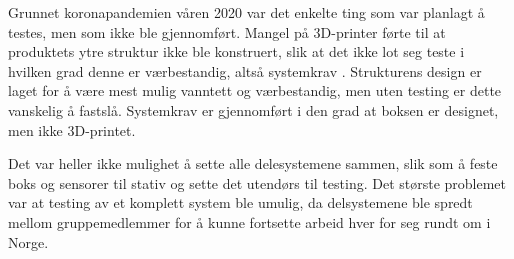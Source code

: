 Grunnet koronapandemien våren 2020 var det enkelte ting som var planlagt å testes, men som ikke ble gjennomført. 
Mangel på 3D-printer førte til at produktets ytre struktur ikke ble konstruert, slik at det ikke lot seg teste i hvilken grad denne er værbestandig, altså systemkrav . 
Strukturens design er laget for å være mest mulig vanntett og værbestandig, men uten testing er dette vanskelig å fastslå.
Systemkrav  er gjennomført i den grad at boksen er designet, men ikke 3D-printet. 

Det var heller ikke mulighet å sette alle delesystemene sammen, slik som å feste boks og sensorer til stativ og sette det utendørs til testing.
Det største problemet var at testing av et komplett system ble umulig, da delsystemene ble spredt mellom gruppemedlemmer for å kunne fortsette arbeid hver for seg rundt om i Norge. 

